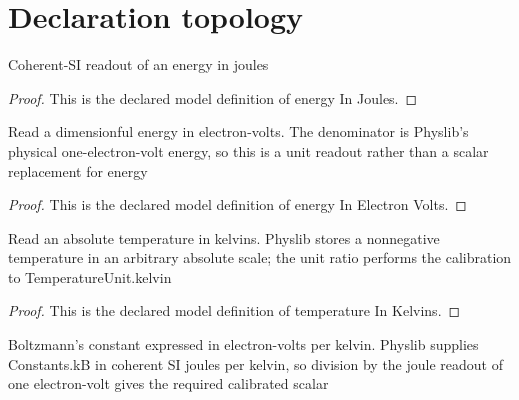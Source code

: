 \section{Declaration topology}
\begin{definition}
  \label{def:physics:phyx-mini-0575:phyxminiproblems-problemphyxmini0575-energyinjoules}
  Coherent-SI readout of an energy in joules
\end{definition}
\begin{proof}
  This is the declared model definition of energy In Joules.
\end{proof}
\begin{definition}
  \label{def:physics:phyx-mini-0575:phyxminiproblems-problemphyxmini0575-energyinelectronvolts}
  Read a dimensionful energy in electron-volts. The denominator is Physlib's physical one-electron-volt energy, so this is a unit readout rather than a scalar replacement for energy
\end{definition}
\begin{proof}
  This is the declared model definition of energy In Electron Volts.
\end{proof}
\begin{definition}
  \label{def:physics:phyx-mini-0575:phyxminiproblems-problemphyxmini0575-temperatureinkelvins}
  Read an absolute temperature in kelvins. Physlib stores a nonnegative temperature in an arbitrary absolute scale; the unit ratio performs the calibration to TemperatureUnit.kelvin
\end{definition}
\begin{proof}
  This is the declared model definition of temperature In Kelvins.
\end{proof}
\begin{definition}
  \label{def:physics:phyx-mini-0575:phyxminiproblems-problemphyxmini0575-boltzmannconstantinelectronvoltsperkelvin}
  Boltzmann's constant expressed in electron-volts per kelvin. Physlib supplies Constants.kB in coherent SI joules per kelvin, so division by the joule readout of one electron-volt gives the required calibrated scalar
\end{definition}
